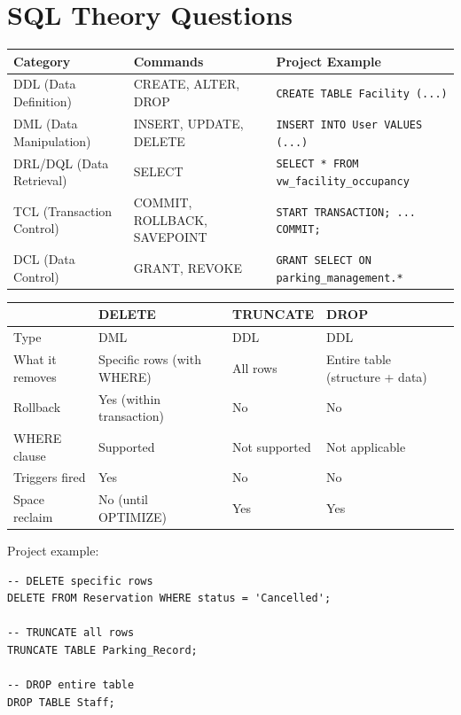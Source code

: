 \documentclass[12pt,a4paper]{article}
\begin{document}
\section{SQL Theory Questions}

\begin{questionbox}
\end{questionbox}
\begin{answerbox}
\begin{longtable}{@{}llp{7cm}@{}}
\toprule
\textbf{Category} & \textbf{Commands} & \textbf{Project Example} \\
\midrule
DDL (Data Definition) & CREATE, ALTER, DROP & \texttt{CREATE TABLE Facility (...)} \\
DML (Data Manipulation) & INSERT, UPDATE, DELETE & \texttt{INSERT INTO User VALUES (...)} \\
DRL/DQL (Data Retrieval) & SELECT & \texttt{SELECT * FROM vw\_facility\_occupancy} \\
TCL (Transaction Control) & COMMIT, ROLLBACK, SAVEPOINT & \texttt{START TRANSACTION; ... COMMIT;} \\
DCL (Data Control) & GRANT, REVOKE & \texttt{GRANT SELECT ON parking\_management.*} \\
\bottomrule
\end{longtable}
\end{answerbox}

\begin{questionbox}
\end{questionbox}
\begin{answerbox}
\begin{longtable}{@{}lp{3.5cm}p{3.5cm}p{3.5cm}@{}}
\toprule
& \textbf{DELETE} & \textbf{TRUNCATE} & \textbf{DROP} \\
\midrule
Type & DML & DDL & DDL \\
What it removes & Specific rows (with WHERE) & All rows & Entire table (structure + data) \\
Rollback & Yes (within transaction) & No & No \\
WHERE clause & Supported & Not supported & Not applicable \\
Triggers fired & Yes & No & No \\
Space reclaim & No (until OPTIMIZE) & Yes & Yes \\
\bottomrule
\end{longtable}

Project example:
\begin{lstlisting}
-- DELETE specific rows
DELETE FROM Reservation WHERE status = 'Cancelled';

-- TRUNCATE all rows
TRUNCATE TABLE Parking_Record;

-- DROP entire table
DROP TABLE Staff;
\end{lstlisting}
\end{answerbox}
\end{document}
